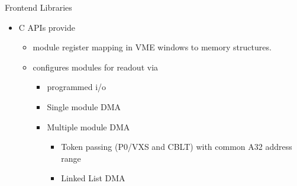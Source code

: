 Frontend Libraries
\begin{itemize}
\item C APIs provide
  \begin{itemize}
  \item module register mapping in VME windows to memory structures.
  \item configures modules for readout via
    \begin{itemize}
    \item programmed i/o
    \item Single module DMA
    \item Multiple module DMA
       \begin{itemize}
       \item Token passing (P0/VXS and CBLT) with common A32 address range
       \item Linked List DMA
       \end{itemize}
    \end{itemize}
  \end{itemize}
\end{itemize}
